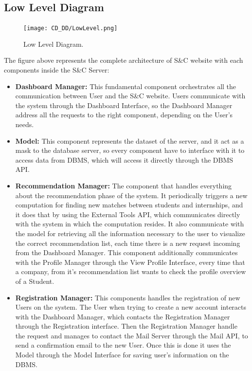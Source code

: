 \subsection{Low Level Diagram}
\label{subsec:low_level_diagram}%

\begin{figure}[H]
    \begin{center}
        \texttt{[image: CD\_DD/LowLevel.png]}
        \caption{Low Level Diagram.}
        \label{fig:low_level_diagram}%
    \end{center}
\end{figure}

\noindent The figure above represents the complete architecture of S\&C website with each components inside the S\&C Server:
\begin{itemize}
    \item \textbf{Dashboard Manager:} This fundamental component orchestrates all the communication between User and the S\&C website. Users communicate with the system through the Dashboard Interface, so the Dashboard Manager address all the requests to the right component, depending on the User's needs. 
    \item \textbf{Model:} This component represents the dataset of the server, and it act as a mask to the database server, so every component have to interface with it to access data from DBMS, which will access it directly through the DBMS API. 
    \item \textbf{Recommendation Manager:}  The component that handles everything about the recommendation phase of the system. It periodically triggers a new computation for finding new matches between students and internships, and it does that by using the External Tools API, which communicates directly with the system in which the computation resides. It also communicate with the model for retrieving all the information necessary to the user to visualize the correct recommendation list, each time there is a new request incoming from the Dashboard Manager. This component additionally communicates with the Profile Manager through the View Profile Interface, every time that a company, from it's recommendation list wants to check the profile overview of a Student.
    \item \textbf{Registration Manager:} This components handles the registration of new Users on the system. The User when trying to create a new account interacts with the Dashboard Manager, which contacts the Registration Manager through the Registration interface. Then the Registration Manager handle the request and manages to contact the Mail Server through the Mail API, to send a confirmation email to the new User. Once this is done it uses the Model through the Model Interface for saving user's information on the DBMS.

\end{itemize}
